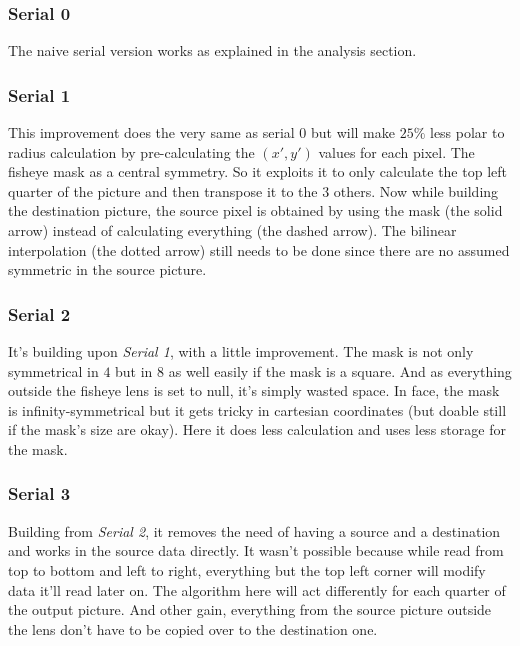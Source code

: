 \documentclass[10pt,a4paper]{article}
\begin{document}
\subsubsection{Serial 0}

The naive serial version works as explained in the analysis section.

\subsubsection{Serial 1}

This improvement does the very same as serial 0 but will make $25\%$ less polar
to radius calculation by pre-calculating the $(x\prime,y\prime)$ values for
each pixel. The fisheye mask as a central symmetry. So it exploits it to only
calculate the top left quarter of the picture and then transpose it to the $3$
others. Now while building the destination picture, the source pixel is
obtained by using the mask (the solid arrow) instead of calculating everything
(the dashed arrow).  The bilinear interpolation (the dotted arrow) still needs
to be done since there are no assumed symmetric in the source picture.

\subsubsection{Serial 2}

It’s building upon \emph{Serial 1}, with a little improvement. The mask is not
only symmetrical in $4$ but in $8$ as well easily if the mask is a square. And
as everything outside the fisheye lens is set to null, it's simply wasted
space. In face, the mask is infinity-symmetrical but it gets tricky in
cartesian coordinates (but doable still if the mask's size are okay). Here it
does less calculation and uses less storage for the mask.

\subsubsection{Serial 3}

Building from \emph{Serial 2}, it removes the need of having a source and a
destination and works in the source data directly. It wasn't possible because
while read from top to bottom and left to right, everything but the top left
corner will modify data it’ll read later on. The algorithm here will act
differently for each quarter of the output picture. And other gain, everything
from the source picture outside the lens don’t have to be copied over to the
destination one.
\end{document}
